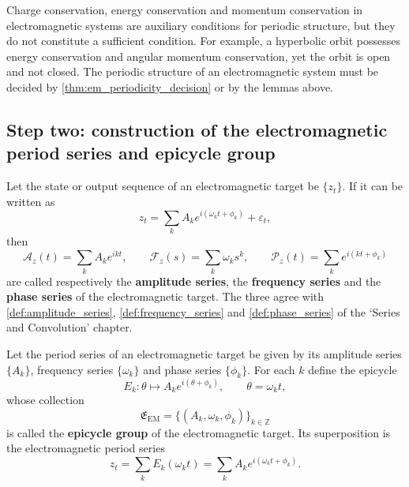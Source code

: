 \begin{remark}\label{rem:em_invariant_not_period}
Charge conservation, energy conservation and momentum conservation in electromagnetic systems are auxiliary conditions for periodic structure, but they do not constitute a sufficient condition. For example, a hyperbolic orbit possesses energy conservation and angular momentum conservation, yet the orbit is open and not closed. The periodic structure of an electromagnetic system must be decided by \cref{thm:em_periodicity_decision} or by the lemmas above.
\end{remark}

\subsection{Step two: construction of the electromagnetic period series and epicycle group}

\begin{definition}\label{def:em_series}
Let the state or output sequence of an electromagnetic target be $\{z_t\}$. If it can be written as
\[
z_t=\sum_k A_k e^{i(\omega_k t+\phi_k)}+\varepsilon_t,
\]
then
\[
\mathcal A_z(t)=\sum_k A_k e^{ikt},\qquad
\mathcal F_z(s)=\sum_k \omega_k s^k,\qquad
\mathcal P_z(t)=\sum_k e^{i(kt+\phi_k)}
\]
are called respectively the \textbf{amplitude series}, the \textbf{frequency series} and the \textbf{phase series} of the electromagnetic target. The three agree with \cref{def:amplitude_series}, \cref{def:frequency_series} and \cref{def:phase_series} of the `Series and Convolution' chapter.
\end{definition}

\begin{definition}\label{def:em_epicycle_group}
Let the period series of an electromagnetic target be given by its amplitude series $\{A_k\}$, frequency series $\{\omega_k\}$ and phase series $\{\phi_k\}$. For each $k$ define the epicycle
\[
E_k:\theta\mapsto A_k e^{i(\theta+\phi_k)},\qquad \theta=\omega_k t,
\]
whose collection
\[
\mathfrak E_{\mathrm{EM}}=\{(A_k,\omega_k,\phi_k)\}_{k\in\mathbb Z}
\]
is called the \textbf{epicycle group} of the electromagnetic target. Its superposition is the electromagnetic period series
\[
z_t=\sum_k E_k(\omega_k t)=\sum_k A_k e^{i(\omega_k t+\phi_k)}.
\]
\end{definition}

